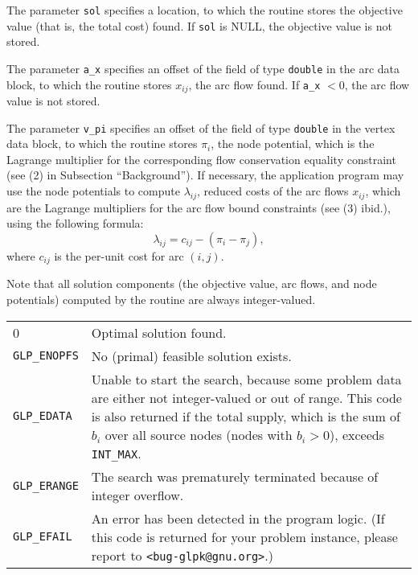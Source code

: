 \documentclass[11pt]{report}
\makeatletter
\def\para#1{\noindent{\bf#1}}
\def\returns{\para{Returns}}
\newenvironment{retlist}
{  \def\arraystretch{1.5}
   \noindent
   \begin{tabular}{@{}p{1in}@{}p{5.5in}@{}}
}
{\end{tabular}}
\makeatother
\begin{document}
The parameter \verb|sol| specifies a location, to which the routine
stores the objective value (that is, the total cost) found. If
\verb|sol| is NULL, the objective value is not stored.

The parameter \verb|a_x| specifies an offset of the field of type
\verb|double| in the arc data block, to which the routine stores
$x_{ij}$, the arc flow found. If \verb|a_x| $<0$, the arc flow value is
not stored.

The parameter \verb|v_pi| specifies an offset of the field of type
\verb|double| in the vertex data block, to which the routine stores
$\pi_i$, the node potential, which is the Lagrange multiplier for the
corresponding flow conservation equality constraint (see (2) in
Subsection ``Background''). If necessary, the application program may
use the node potentials to compute $\lambda_{ij}$, reduced costs of the
arc flows $x_{ij}$, which are the Lagrange multipliers for the arc flow
bound constraints (see (3) ibid.), using the following formula:
$$\lambda_{ij}=c_{ij}-(\pi_i-\pi_j),$$
where $c_{ij}$ is the per-unit cost for arc $(i,j)$.


Note that all solution components (the objective value, arc flows, and
node potentials) computed by the routine are always integer-valued.

\returns

\begin{retlist}
0 & Optimal solution found.\\

\verb|GLP_ENOPFS| & No (primal) feasible solution exists.\\

\verb|GLP_EDATA| & Unable to start the search, because some problem
data are either not integer-valued or out of range. This code is also
returned if the total supply, which is the sum of $b_i$ over all source
nodes (nodes with $b_i>0$), exceeds \verb|INT_MAX|.\\

\verb|GLP_ERANGE| & The search was prematurely terminated because of
integer overflow.\\

\verb|GLP_EFAIL| & An error has been detected in the program logic.
(If this code is returned for your problem instance, please report to
\verb|<bug-glpk@gnu.org>|.)\\
\end{retlist}

\para{Comments}
\end{document}
